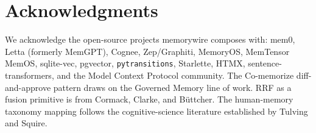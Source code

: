 \documentclass[11pt,letterpaper,twocolumn]{article}
\begin{document}
\section*{Acknowledgments}

We acknowledge the open-source projects memorywire composes with: mem0, Letta (formerly MemGPT), Cognee, Zep/Graphiti, MemoryOS, MemTensor MemOS, sqlite-vec, pgvector, \texttt{pytransitions}, Starlette, HTMX, sentence-transformers, and the Model Context Protocol community. The Co-memorize diff-and-approve pattern draws on the Governed Memory line of work. RRF as a fusion primitive is from Cormack, Clarke, and B{\"u}ttcher. The human-memory taxonomy mapping follows the cognitive-science literature established by Tulving and Squire.



\end{document}
